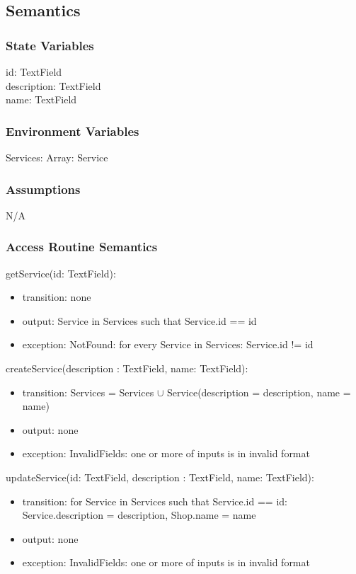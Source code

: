 \documentclass[12pt, titlepage]{article}
\begin{document}
\subsection{Semantics}

\subsubsection{State Variables}
 
id: TextField \\
description: TextField \\
name: TextField

\subsubsection{Environment Variables}

Services: Array: Service

\subsubsection{Assumptions}

N/A

\subsubsection{Access Routine Semantics}

\noindent getService(id: TextField):
\begin{itemize}
    \item transition: none
    \item output: Service in Services such that Service.id == id
    \item exception: NotFound: for every Service in Services: Service.id != id
\end{itemize}

\noindent createService(description : TextField, name: TextField):
\begin{itemize}
    \item transition: Services = Services $\cup$ Service(description = description, name = name)
    \item output: none
    \item exception: InvalidFields: one or more of inputs is
    in invalid format
\end{itemize}

\noindent updateService(id: TextField, description : TextField, name: TextField):
\begin{itemize}
    \item transition: for Service in Services such that Service.id == id: Service.description = description, Shop.name = name
    \item output: none
    \item exception: InvalidFields: one or more of inputs is in invalid format
\end{itemize}
\end{document}
